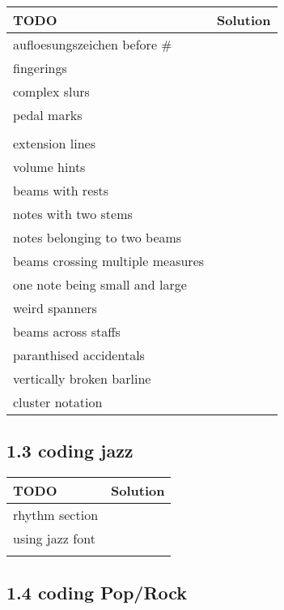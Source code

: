  \begin{tabular}{|p{}|p{}|}
 \hline
 \textbf{TODO} &
 \textbf{Solution} 
\\
 \hline
	aufloesungszeichen before \# &
  
\\ 	\hline
	fingerings &
  
\\ 	\hline
	complex slurs &
  
\\ 	\hline
	pedal marks &
  
\\ 	\hline
 &
  
\\ 	\hline
	extension lines &
  
\\ 	\hline
	volume hints &
  
\\ 	\hline
	beams with rests &
  
\\ 	\hline
	notes with two stems &
  
\\ 	\hline
	notes belonging to two beams &
  
\\ 	\hline
	beams crossing multiple measures &
  
\\ 	\hline
	one note being small and large &
  
\\ 	\hline
	weird spanners &
  
\\ 	\hline
	beams across staffs &
  
\\ 	\hline
	paranthised accidentals &
  
\\ 	\hline
	vertically broken barline &
  
\\ 	\hline
	cluster notation &
  
\\ 	\hline
 \end{tabular} \subsection*{1.3 coding jazz}
 \begin{tabular}{|p{}|p{}|}
 \hline
 \textbf{TODO} &
 \textbf{Solution} 
\\
 \hline
	rhythm section &
  
\\ 	\hline
	using jazz font &
  
\\ 	\hline
 &
  
\\ 	\hline
 \end{tabular} \subsection*{1.4 coding Pop/Rock}
